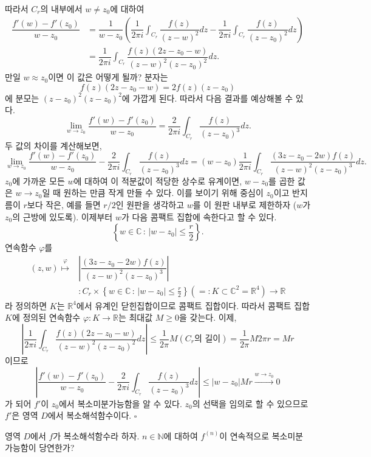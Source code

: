 따라서 $C_r$의 내부에서 $w\ne z_0$에 대하여 
\begin{align*}
\dfrac{f'(w)-f'(z_0)}{w-z_0}
&= \dfrac1{w-z_0} \left(
\dfrac1{2\pi i} \int_{C_r} \dfrac{f(z)}{(z-w)^2}dz 
- \dfrac1{2\pi i} \int_{C_r} \dfrac{f(z)}{(z-z_0)^2}dz 
\right) \\
&= \dfrac1{2\pi i}\int_{C_r} \dfrac{f(z)(2z - z_0 -w)}{(z-w)^2(z-z_0)^2} dz.
\end{align*}
만일 $w\approx z_0$이면 이 값은 어떻게 될까?
분자는 
\[
f(z)(2z - z_0 -w) = 2f(z)(z-z_0)
\]
에 분모는 $(z-z_0)^2(z-z_0)^2$에 가깝게 된다.
따라서 다음 결과를 예상해볼 수 있다.
\[
\lim_{w\to z_0} \dfrac{f'(w) - f'(z_0)}{w-z_0} = \dfrac2{2\pi i} \int_{C_r} \dfrac{f(z)}{(z-z_0)^3}dz.
\]
두 값의 차이를 계산해보면,
\[
\lim_{w\to z_0} \dfrac{f'(w) - f'(z_0)}{w-z_0} - \dfrac2{2\pi i} \int_{C_r} \dfrac{f(z)}{(z-z_0)^3}dz
= (w-z_0) \dfrac1{2\pi i} \int_{C_r} \dfrac{(3z-z_0-2w)f(z)}{(z-w)^2(z-z_0)^3}dz.
\]
$z_0$에 가까운 모든 $w$에 대하여 이 적분값이 적당한 상수로 유계이면,
$w-z_0$를 곱한 값은 $w\to z_0$일 때 원하는 만큼 작게 만들 수 있다.
이를 보이기 위해 중심이 $z_0$이고 반지름이 $r$보다 작은, 예를 들면 $r/2$인
원판을  생각하고 $w$를 이 원판 내부로 제한하자 ($w$가 $z_0$의 근방에 있도록).
이제부터 $w$가 다음 콤팩트 집합에 속한다고 할 수 있다.
\[
\left\{ w\in\mathbb C\,:\, |w-z_0| \le \frac r2 \right\}.
\]
연속함수 $\varphi$를
\begin{align*}
(z,w) \stackrel{\varphi}{\mapsto} & \left| \dfrac{(3z-z_0-2w)f(z)}{(z-w)^2(z-z_0)^3} \right| \\
& : C_r \times \left\{w\in\mathbb C\,:\, |w-z_0| \le \frac r2 \right\}
(=: K \subset \mathbb C^2 = \mathbb R^4 ) \to \mathbb R
\end{align*}
라 정의하면 $K$는 $\mathbb R^4$에서 유계인 닫힌집합이므로 콤팩트 집합이다.
따라서 콤팩트 집합 $K$에 정의된 연속함수 $\varphi : K \to \mathbb R$는 
최대값 $M\ge0$을 갖는다.
이제,
\[
\left| \dfrac1{2\pi i}\int_{C_r} \dfrac{f(z)(2z - z_0 -w)}{(z-w)^2(z-z_0)^2} dz \right|
\le \dfrac1{2\pi} M(C_r\text{의 길이}) = \dfrac1{2\pi}M2\pi r = Mr
\]
이므로
\[
\left| \dfrac{f'(w) - f'(z_0)}{w-z_0} - \dfrac2{2\pi i} \int_{C_r} \dfrac{f(z)}{(z-z_0)^3}dz \right|
\le |w-z_0|Mr \stackrel{w\to z_0}{\longrightarrow} 0
\]
가 되어 $f'$이 $z_0$에서 복소미분가능함을 알 수 있다.
$z_0$의 선택을 임의로 할 수 있으므로 $f'$은 영역 $D$에서 복소해석함수이다.
\hfill $\square$

\begin{salt_exercise} \label{ex-3-29}
영역  $D$에서 $f$가 복소해석함수라 하자.
$n\in\mathbb N$에 대하여 $f^{(n)}$이 연속적으로 복소미분가능함이 당연한가?
\end{salt_exercise}


